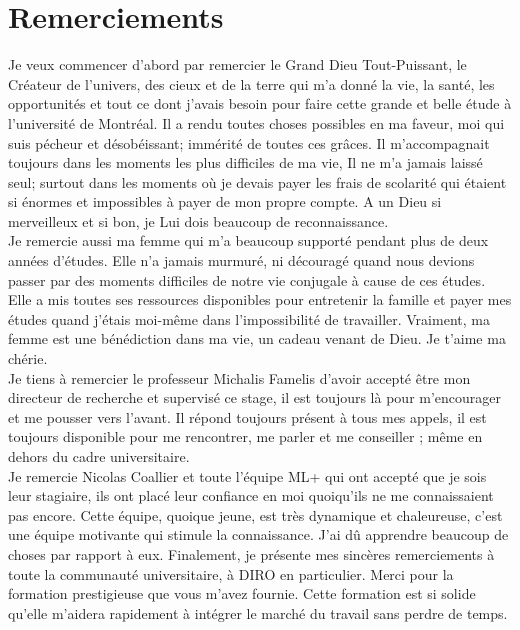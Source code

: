 \documentclass[12pt, french]{article}
\begin{document}
\tableofcontents
\newpage	
{}
\section*{Remerciements}
Je veux commencer d'abord par remercier le Grand Dieu Tout-Puissant, le Créateur de l'univers, des cieux et de la terre qui m'a donné la vie, la santé, les opportunités et tout ce dont j'avais besoin pour faire cette grande et belle étude à l'université de Montréal. Il a rendu toutes choses possibles en ma faveur, moi qui suis pécheur et désobéissant; immérité de toutes ces grâces. Il m'accompagnait toujours dans les moments les plus difficiles de ma vie, Il ne m'a jamais laissé seul; surtout dans les moments où je devais payer les frais de scolarité qui étaient si énormes et impossibles à payer de mon propre compte. A un Dieu si merveilleux et si bon, je Lui dois beaucoup de reconnaissance.  \\
	
	Je remercie aussi ma femme qui m'a beaucoup supporté pendant plus de deux années d'études. Elle n'a jamais murmuré, ni découragé quand nous devions passer par des moments difficiles de notre vie conjugale à cause de ces études. Elle a mis toutes ses ressources disponibles pour entretenir la famille et payer mes études quand j’étais moi-même dans l’impossibilité de travailler. Vraiment, ma femme est une bénédiction dans ma vie, un cadeau venant de Dieu. Je t’aime ma chérie. \\
	
	Je tiens à remercier le professeur Michalis Famelis d’avoir accepté être mon directeur de recherche et supervisé ce stage, il est toujours là pour m’encourager et me pousser vers l’avant. Il répond toujours présent à tous mes appels, il est toujours disponible pour me rencontrer, me parler et me conseiller ; même en dehors du cadre universitaire.  \\
	
	Je remercie Nicolas Coallier et toute l’équipe ML+ qui ont accepté que je sois leur stagiaire, ils ont placé  leur confiance en moi quoiqu’ils ne me connaissaient pas encore. Cette équipe, quoique jeune, est très dynamique et chaleureuse, c’est une équipe motivante qui stimule la connaissance. J’ai dû apprendre beaucoup de choses par rapport à eux.
	Finalement, je présente mes sincères remerciements à toute la communauté universitaire, à DIRO en particulier. Merci pour la formation prestigieuse que vous m’avez fournie. Cette formation est si solide qu’elle m’aidera rapidement à intégrer le marché du travail sans perdre de temps. 
	
\end{document}
